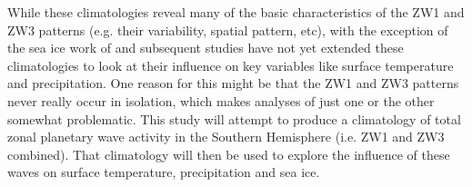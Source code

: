 While these climatologies reveal many of the basic characteristics of the ZW1 and ZW3 patterns (e.g. their variability, spatial pattern, etc), with the exception of the sea ice work of \citet{Raphael2007} and \citet{Raphael2014} subsequent studies have not yet extended these climatologies to look at their influence on key variables like surface temperature and precipitation. One reason for this might be that the ZW1 and ZW3 patterns never really occur in isolation, which makes analyses of just one or the other somewhat problematic. This study will attempt to produce a climatology of total zonal planetary wave activity in the Southern Hemisphere (i.e. ZW1 and ZW3 combined). That climatology will then be used to explore the influence of these waves on surface temperature, precipitation and sea ice.
